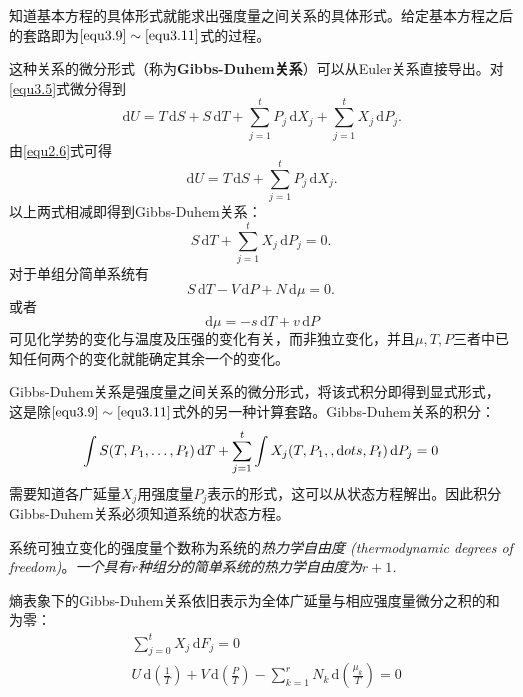 知道基本方程的具体形式就能求出强度量之间关系的具体形式。给定基本方程之后的套路即为$\eqref{equ3.9} \sim \eqref{equ3.11}$式的过程。

这种关系的微分形式（称为{\bf Gibbs-Duhem关系}）可以从Euler关系直接导出。对\eqref{equ3.5}式微分得到
\begin{equation}
\label{equ3.12}
	\,\mathrm dU = T\,\mathrm dS + S\,\mathrm dT + \sum_{j = 1}^t P_j \,\mathrm dX_j + \sum_{j = 1}^t X_j \,\mathrm dP_j.
\end{equation}
由\eqref{equ2.6}式可得
\begin{equation}
\label{equ3.13}
	\,\mathrm dU = T\,\mathrm dS + \sum_{j = 1}^t P_j \,\mathrm dX_j.
\end{equation}
以上两式相减即得到Gibbs-Duhem关系：
\begin{equation}
\label{equ3.14}
	S\,\mathrm dT + \sum_{j = 1}^t X_j \,\mathrm dP_j = 0.
\end{equation}
对于单组分简单系统有
\begin{equation}
\label{equ3.15}
	S\,\mathrm dT - V\,\mathrm dP + N\,\mathrm d\mu = 0.
\end{equation}
或者
\begin{equation}
\label{equ3.16}
	\,\mathrm d\mu = -s\,\mathrm dT + v\,\mathrm dP
\end{equation}
可见化学势的变化与温度及压强的变化有关，而非独立变化，并且$\mu, T, P$三者中已知任何两个的变化就能确定其余一个的变化。

Gibbs-Duhem关系是强度量之间关系的微分形式，将该式积分即得到显式形式，这是除$\eqref{equ3.9} \sim \eqref{equ3.11}$式外的另一种计算套路。Gibbs-Duhem关系的积分：
\[
	\int S(T, P_1, \dots, P_t) \,\mathrm dT + \sum_{j = 1}^t \int X_j(T, P_1, \\,\mathrm dots, P_t) \,\mathrm dP_j = 0
\]
需要知道各广延量$X_j$用强度量$P_j$表示的形式，这可以从状态方程解出。因此积分Gibbs-Duhem关系必须知道系统的状态方程。

系统可独立变化的强度量个数称为系统的{\it 热力学自由度 (thermodynamic degrees of freedom)}。{\it 一个具有$r$种组分的简单系统的热力学自由度为$r + 1$.}

熵表象下的Gibbs-Duhem关系依旧表示为全体广延量与相应强度量微分之积的和为零：
\begin{align}
	&\sum_{j = 0}^t X_j \,\mathrm dF_j = 0 \label{equ3.17} \\
	&U \,\mathrm d\left( \frac{1}{T} \right) + V \,\mathrm d\left( \frac{P}{T} \right) - \sum_{k = 1}^r N_k \,\mathrm d\left( \frac{\mu_k}{T}\right) = 0 \label{equ3.18}
\end{align}


